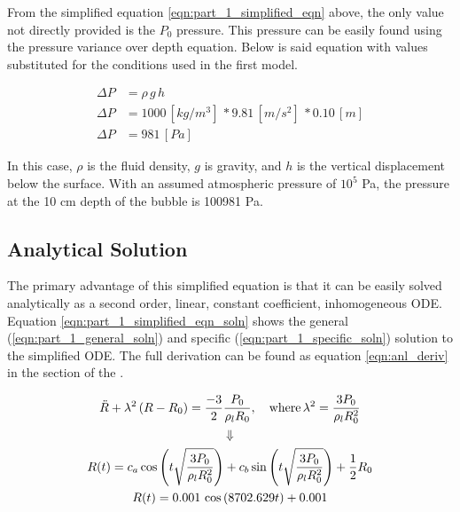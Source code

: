 \documentclass[12pt]{article}
\begin{document}
From the simplified equation \ref{eqn:part_1_simplified_eqn} above, the only value not directly provided is the $P_0$ pressure. This pressure can be easily found using the pressure variance over depth equation. Below is said equation with values substituted for the conditions used in the first model.

\begin{equation}
    \label{eqn:part_1_pressure_at_depth}
    \begin{aligned}
        \Delta P &= \rho \, g \, h \\
        \Delta P &= 1000 \, [kg/m^3] \, * 9.81 \, [m/s^2] \, * 0.10 \, [m]\\
        \Delta P &= 981 \, [Pa]
    \end{aligned}
\end{equation}

In this case, $\rho$ is the fluid density, $g$ is gravity, and $h$ is the vertical displacement below the surface. With an assumed atmospheric pressure of $10^5$ Pa, the pressure at the 10 cm depth of the bubble is 100981 Pa.

\subsection{Analytical Solution}
The primary advantage of this simplified equation is that it can be easily solved analytically as a second order, linear, constant coefficient, inhomogeneous ODE. Equation \ref{eqn:part_1_simplified_eqn_soln} shows the general (\ref{eqn:part_1_general_soln}) and specific (\ref{eqn:part_1_specific_soln}) solution to the simplified ODE. The full derivation can be found as equation \ref{eqn:anl_deriv} in the  section of the .

\begin{subequations}
    \label{eqn:part_1_simplified_eqn_soln}
    \centering
    \begin{gather}
        \ddot R + \lambda^2 \left(R - R_0\right) = \frac{-3}{2} \frac{P_0}{\rho_l R_0}, \quad \text{where} \, \lambda^2 = \frac{3 P_0}{\rho_l R_0^2} \\
        \Downarrow \notag \\
        R(t) = c_a \cos\left(t\sqrt{\frac{3 P_0}{\rho_l R_0^2}}\right) + c_b \sin\left(t\sqrt{\frac{3 P_0}{\rho_l R_0^2}}\right) + \frac {1}{2} R_0 \label{eqn:part_1_general_soln}\\
        R(t) = 0.001 \, \cos\left(8702.629 t \right) + 0.001 \label{eqn:part_1_specific_soln}
    \end{gather}
\end{subequations}
\end{document}
